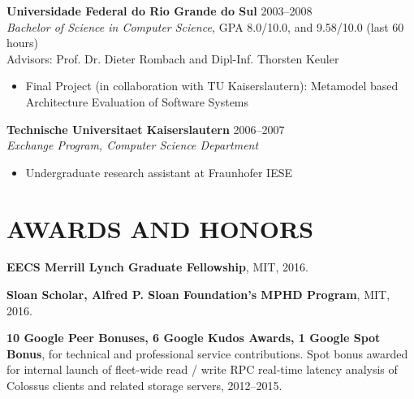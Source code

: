\documentclass[line,margin]{res}
\begin{document}
\begin{resume}
                \textbf{Universidade Federal do Rio Grande do Sul} \hfill 2003--2008 \\
                {\sl Bachelor of Science in Computer Science,} GPA 8.0/10.0, and 9.58/10.0 (last 60 hours) \\
                Advisors: Prof. Dr. Dieter Rombach and Dipl-Inf. Thorsten Keuler
                \begin{itemize}  \itemsep -2pt
                \item  Final Project (in collaboration with TU Kaiserslautern): Metamodel based Architecture Evaluation of Software Systems
                \end{itemize}

                 \textbf{Technische Universitaet Kaiserslautern} \hfill 2006--2007 \\
                {\sl Exchange Program, Computer Science Department}
                \begin{itemize}  \itemsep -2pt
                \item  Undergraduate research assistant at Fraunhofer IESE
                \end{itemize} 

%

\section{AWARDS AND HONORS}

\textbf{EECS Merrill Lynch Graduate Fellowship}, MIT, 2016.


\textbf{Sloan Scholar, Alfred P. Sloan Foundation's MPHD Program}, MIT, 2016.

\textbf{10 Google Peer Bonuses, 6 Google Kudos Awards, 1 Google Spot Bonus}, for technical and professional service contributions.  Spot bonus awarded for internal launch of fleet-wide read / write RPC real-time latency analysis of Colossus clients and related storage servers, 2012--2015.


\end{resume}
\end{document}
